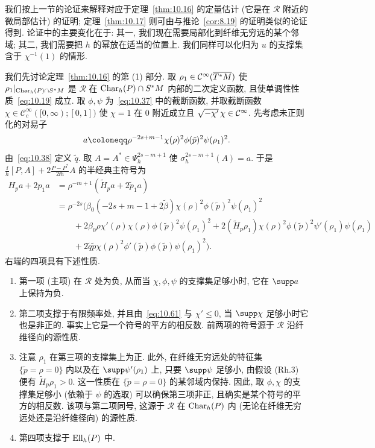 我们按上一节的论证来解释对应于定理~\ref{thm:10.16} 的定量估计 (它是在 $\mathcal{R}$ 附近的微局部估计) 的证明; 定理~\ref{thm:10.17} 则可由与推论~\ref{cor:8.19} 的证明类似的论证得到. 论证中的主要变化在于: 其一, 我们现在需要局部化到纤维无穷远的某个邻域; 其二, 我们需要把 $h$ 的幂放在适当的位置上. 我们同样可以化归为 $u$ 的支撑集含于 $\chi^{-1}(1)$ 的情形.

我们先讨论定理~\ref{thm:10.16} 的第 (1) 部分. 取 $\rho_1 \in \mathcal{C}^\infty(\overline{T^* M})$ 使 $\rho_1|_{\operatorname{Char}_h(P) \cap S^* M}$ 是 $\mathcal{R}$ 在 $\operatorname{Char}_h(P) \cap S^* M$ 内部的二次定义函数, 且使单调性性质~\eqref{eq:10.19} 成立. 取 $\phi, \psi$ 为~\eqref{eq:10.37} 中的截断函数, 并取截断函数 $\chi \in \mathcal{C}_c^\infty([0, \infty); [0,1])$ 使 $\chi = 1$ 在 $0$ 附近成立且 $\sqrt{-\chi'}\,\chi \in \mathcal{C}^\infty$. 先考虑未正则化的对易子
\begin{equation}\label{eq:10.65}
    a \defeq \rho^{-2s+m-1} \chi(\rho)^2 \phi(\tilde{p})^2 \psi(\rho_1)^2.
\end{equation}
由~\eqref{eq:10.38} 定义 $\tilde{q}$. 取 $A = A^* \in \Psi_h^{2s-m+1}$ 使 $\sigma_h^{2s-m+1}(A) = a$. 于是 $\frac{\ii}{h}[P, A] + 2\frac{P - P^*}{2\ii h}A$ 的半经典主符号为
\begin{equation}\label{eq:10.66}
    \begin{aligned}
        H_p a + 2p_1 a &= \rho^{-m+1}(\tilde{H}_p a + 2\tilde{p}_1 a) \\
        &= \rho^{-2s}\Big( \beta_0(-2s + m - 1 + 2\tilde{\beta})\chi(\rho)^2 \phi(\tilde{p})^2 \psi(\rho_1)^2 \\
        &\qquad + 2\beta_0\rho\chi'(\rho)\chi(\rho)\phi(\tilde{p})^2\psi(\rho_1)^2
        + 2(\tilde{H}_p\rho_1)\chi(\rho)^2\phi(\tilde{p})^2\psi'(\rho_1)\psi(\rho_1) \\
        &\qquad + 2\tilde{q}\tilde{p}\chi(\rho)^2\phi'(\tilde{p})\phi(\tilde{p})\psi(\rho_1)^2 \Big).
    \end{aligned}
\end{equation}
右端的四项具有下述性质.

\begin{enumerate}
    \item 第一项 (主项) 在 $\mathcal{R}$ 处为负, 从而当 $\chi, \phi, \psi$ 的支撑集足够小时, 它在 $\supp a$ 上保持为负.
    \item 第二项支撑于有限频率处, 并且由~\eqref{eq:10.61} 与 $\chi' \le 0$, 当 $\supp\chi$ 足够小时它也是非正的. 事实上它是一个符号的平方的相反数. 前两项的符号源于 $\mathcal{R}$ 沿纤维径向的源性质.
    \item 注意 $\rho_1$ 在第三项的支撑集上为正. 此外, 在纤维无穷远处的特征集 $\{\tilde{p} = \rho = 0\}$ 内以及在 $\supp\psi'(\rho_1)$ 上, 只要 $\supp\psi$ 足够小, 由假设 (Rh.3) 便有 $\tilde{H}_p\rho_1 > 0$. 这一性质在 $\{\tilde{p} = \rho = 0\}$ 的某邻域内保持. 因此, 取 $\phi, \chi$ 的支撑集足够小 (依赖于 $\psi$ 的选取) 可以确保第三项非正, 且确实是某个符号的平方的相反数. 该项与第二项同号, 这源于 $\mathcal{R}$ 在 $\operatorname{Char}_h(P)$ 内 (无论在纤维无穷远处还是沿纤维径向) 的源性质.
    \item 第四项支撑于 $\operatorname{Ell}_h(P)$ 中.
\end{enumerate}

